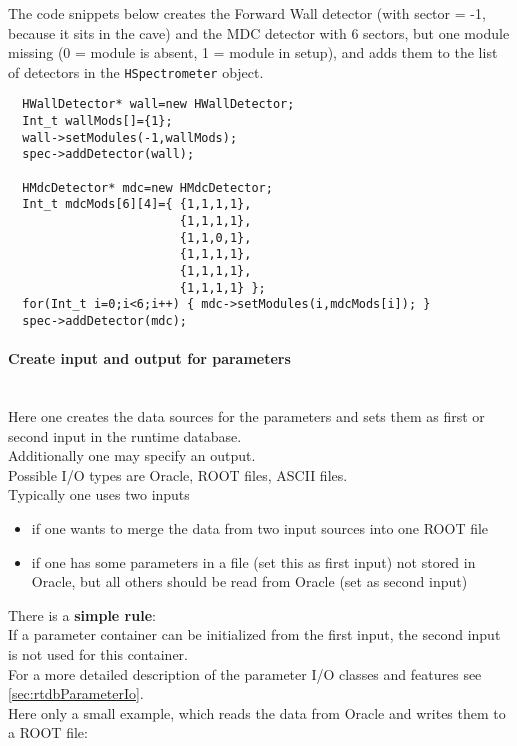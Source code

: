 The code snippets below creates the Forward Wall detector (with sector = -1, because it sits in the cave) and the MDC detector 
with 6 sectors, but one module missing (0 = module is absent, 1 = module in setup), and adds them to the list of detectors 
in the \verb+HSpectrometer+ object.
\begin{lstlisting}
  HWallDetector* wall=new HWallDetector;
  Int_t wallMods[]={1};
  wall->setModules(-1,wallMods);
  spec->addDetector(wall);

  HMdcDetector* mdc=new HMdcDetector;
  Int_t mdcMods[6][4]={ {1,1,1,1},
                        {1,1,1,1},
                        {1,1,0,1},
                        {1,1,1,1},
                        {1,1,1,1},
                        {1,1,1,1} };
  for(Int_t i=0;i<6;i++) { mdc->setModules(i,mdcMods[i]); }
  spec->addDetector(mdc);
\end{lstlisting}

\paragraph{Create input and output for parameters} ~\\
Here one creates the data sources for the parameters and sets them as first or second input in the runtime database.\\
Additionally one may specify an output.\\
Possible I/O types are Oracle, ROOT files, ASCII files.\\

Typically one uses two inputs
\begin{itemize}
  \setlength{\itemsep}{0pt}    
  \item if one wants to merge the data from two input sources into one ROOT file
  \item if one has some parameters in a file (set this as first input) not stored in Oracle, but all others should be
        read from Oracle (set as second input)
\end{itemize}

There is a \textbf{simple rule}:\\
If a parameter container can be initialized from the first input, the second input is not used for this container.\\

For a more detailed description of the parameter I/O classes and features see \ref{sec:rtdbParameterIo}.\\
Here only a small example, which reads the data from Oracle and writes them to a ROOT file:

